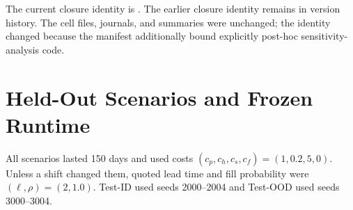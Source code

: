 The current closure identity is
. The earlier closure identity remains in
version history. The cell files, journals, and summaries were unchanged; the
identity changed because the manifest additionally bound explicitly post-hoc
sensitivity-analysis code.

\section{Held-Out Scenarios and Frozen Runtime}
\label{app:scenarios}

All scenarios lasted 150 days and used costs
$(c_p,c_h,c_s,c_f)=(1,0.2,5,0)$. Unless a shift changed them, quoted lead time
and fill probability were $(\ell,\rho)=(2,1.0)$. Test-ID used seeds 2000--2004
and Test-OOD used seeds 3000--3004.

\begin{table}[t]
  \centering
  \scriptsize
  \caption{\textbf{Exact held-out scenario configurations.} NB$(\mu,r)$ denotes
  negative-binomial demand with mean $\mu$ and dispersion $r$. The serialized
  dispersion field in the Poisson scenario is ignored by Poisson sampling.}
  \label{tab:scenarios}
\end{table}

